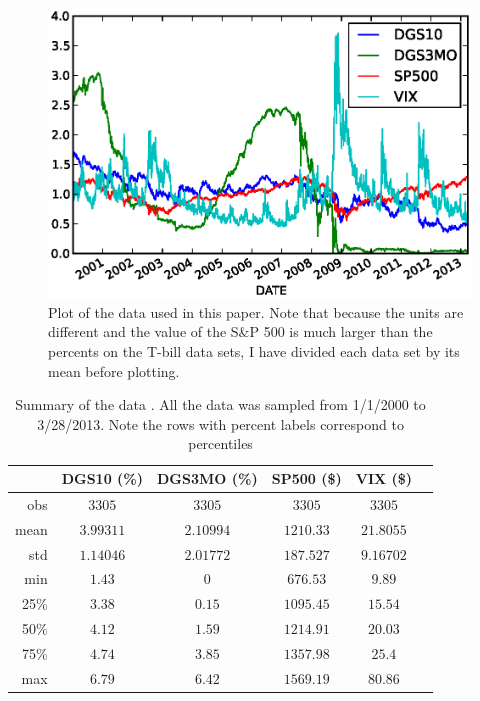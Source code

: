 \documentclass[a4paper, 11pt]{article}
\theoremstyle{definition} %
\numberwithin{equation}{section}
\begin{document}
    \begin{figure}[ht]
        \centering
        \includegraphics[width=6in]{./Figures/all_data.eps}
        \captionsetup{width=5.5in}
        \caption{\small Plot of the data used in this paper. Note that because the units are different and the value of the S\&P 500 is much larger than the percents on the T-bill data sets, I have divided each data set by its mean before plotting.}
        \label{fig:alldata}
    \end{figure}

    \begin{table}[ht!]
      \begin{center}
        \begin{tabular}{r|ccccc}
        \toprule
           & DGS10  (\%)& DGS3MO  (\%)& SP500 (\$)& VIX (\$)\\
          \midrule
          \midrule
          obs & $3305$ & $3305$ & $3305$ & $3305$\\
          mean & $3.99311$ & $2.10994$ & $1210.33$ & $21.8055$\\
          std & $1.14046$ & $2.01772$ & $187.527$ & $9.16702$\\
          min & $1.43$ & $0$ & $676.53$ & $9.89$\\
          25\% & $3.38$ & $0.15$ & $1095.45$ & $15.54$\\
          50\% & $4.12$ & $1.59$ & $1214.91$ & $20.03$\\
          75\% & $4.74$ & $3.85$ & $1357.98$ & $25.4$\\
          max & $6.79$ & $6.42$ & $1569.19$ & $80.86$\\
        \bottomrule
        \end{tabular}
        \captionsetup{width=5.5in}
        \caption{\small Summary of the data . All the data was sampled from 1/1/2000 to 3/28/2013. Note the rows with percent labels correspond to percentiles}
        \label{tab:describe}
      \end{center}
    \end{table}
\end{document}
